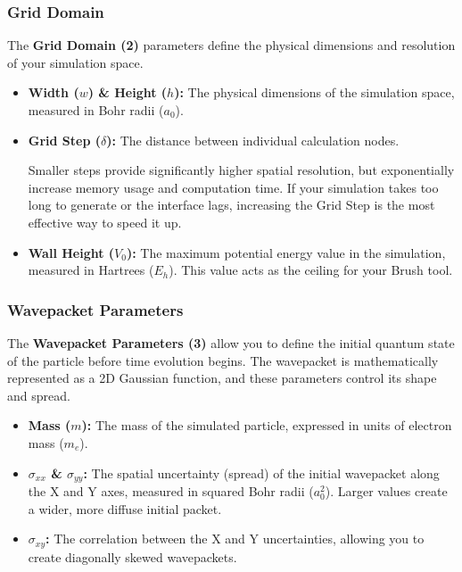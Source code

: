 \documentclass[11pt, a4paper]{article}
\begin{document}
\subsubsection{Grid Domain}
The \textbf{Grid Domain (2)} parameters define the physical dimensions and resolution of your simulation space.
\begin{itemize}
    \item \textbf{Width ($w$) \& Height ($h$):} The physical dimensions of the simulation space, measured in Bohr radii ($a_0$).
    \item \textbf{Grid Step ($\delta$):} The distance between individual calculation nodes.

          \begin{Note}
              Smaller steps provide significantly higher spatial resolution, but exponentially increase memory usage and computation time. If your simulation takes too long to generate or the interface lags, increasing the Grid Step is the most effective way to speed it up.
          \end{Note}

    \item \textbf{Wall Height ($V_0$):} The maximum potential energy value in the simulation, measured in Hartrees ($E_h$). This value acts as the ceiling for your Brush tool.
\end{itemize}

\subsubsection{Wavepacket Parameters}
The \textbf{Wavepacket Parameters (3)} allow you to define the initial quantum state of the particle before time evolution begins. The wavepacket is mathematically represented as a 2D Gaussian function, and these parameters control its shape and spread.
\begin{itemize}
    \item \textbf{Mass ($m$):} The mass of the simulated particle, expressed in units of electron mass ($m_e$).
    \item \textbf{$\sigma_{xx}$ \& $\sigma_{yy}$:} The spatial uncertainty (spread) of the initial wavepacket along the X and Y axes, measured in squared Bohr radii ($a_0^2$). Larger values create a wider, more diffuse initial packet.
    \item \textbf{$\sigma_{xy}$:} The correlation between the X and Y uncertainties, allowing you to create diagonally skewed wavepackets.
\end{itemize}
\end{document}
